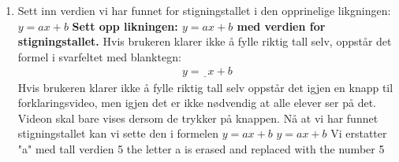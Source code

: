\documentclass[12pt,twoside,onecolumn]{article}
\begin{document}
\begin{Exercise}
\begin{enumerate}
\item Sett inn verdien vi har funnet for stigningstallet i den opprinelige likgningen: $y = ax + b$ 
\newline
\textbf{Sett opp likningen: $y = ax + b$ med verdien for stigningstallet.}
\newline
{\color{Maroon} Hvis brukeren klarer ikke å fylle riktig tall selv, oppstår det formel i svarfeltet med blanktegn: 
\begin{align}
y = \underline{\phantom{0}}x + b
\end{align}}
{\color{Maroon}  Hvis brukeren klarer ikke å fylle riktig tall selv oppstår det igjen en knapp til  forklaringsvideo, men igjen det er ikke nødvendig at alle elever ser på det. Videon skal bare vises  dersom de trykker på knappen.}
\newline
\newline
{\color{gray} Nå at vi har funnet stigningstallet kan vi sette den i formelen  $y = ax + b$ } \newline
{\color{PineGreen} $y = ax + b$  } \newline
{\color{gray}Vi erstatter "a" med tall verdien 5 } \newline
{\color{PineGreen} the letter a is erased and replaced with the number 5 }


\end{enumerate}
\end{Exercise}
\end{document}

